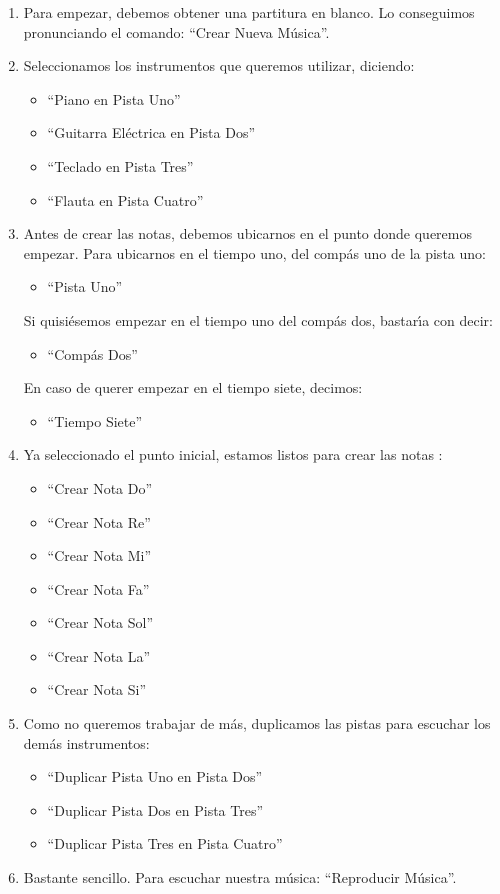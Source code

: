 \begin{enumerate}
  \item Para empezar, debemos obtener una partitura en blanco. Lo conseguimos pronunciando el comando: 
  ``Crear Nueva M\'usica''.

  \item Seleccionamos los instrumentos que queremos utilizar, diciendo:
    \begin{itemize}
      \item ``Piano en Pista Uno''
      \item ``Guitarra El\'ectrica en Pista Dos''
      \item ``Teclado en Pista Tres''
      \item ``Flauta en Pista Cuatro''
    \end{itemize}

  \item Antes de crear las notas, debemos ubicarnos en el punto donde queremos empezar.
  Para ubicarnos en el tiempo uno, del comp\'as uno de la pista uno:
  \begin{itemize}
    \item ``Pista Uno''
  \end{itemize}
        Si quisi\'esemos empezar en el tiempo uno del comp\'as dos, bastar{\'\i}a con decir:
  \begin{itemize}
    \item ``Comp\'as Dos''
  \end{itemize}
        En caso de querer empezar en el tiempo siete, decimos:
  \begin{itemize}
    \item ``Tiempo Siete''
  \end{itemize}

  \item Ya seleccionado el punto inicial, estamos listos para crear las notas :
  \begin{itemize}
    \item ``Crear Nota Do''
    \item ``Crear Nota Re''
    \item ``Crear Nota Mi''
    \item ``Crear Nota Fa''
    \item ``Crear Nota Sol''
    \item ``Crear Nota La''
    \item ``Crear Nota Si''
  \end{itemize}


  \item Como no queremos trabajar de m\'as, duplicamos las pistas para escuchar los dem\'as instrumentos:
  \begin{itemize}
    \item ``Duplicar Pista Uno en Pista Dos''
    \item ``Duplicar Pista Dos en Pista Tres''
    \item ``Duplicar Pista Tres en Pista Cuatro''
  \end{itemize}

  \item Bastante sencillo. Para escuchar nuestra m\'usica: ``Reproducir M\'usica''.

\end{enumerate}

